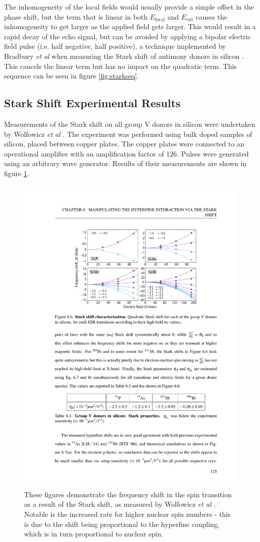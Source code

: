 The inhomogeneity of the local fields would usually provide a simple offset in the phase shift, but the term that is linear in both $E_{\text{local}}$ and $E_{\text{ext}}$ causes the inhomogeneity to get larger as the applied field gets larger.
This would result in a rapid decay of the echo signal, but can be avoided by applying a bipolar electric field pulse (i.e. half negative, half positive), a technique implemented by Bradbury \emph{et al} when measuring the Stark shift of antimony donors in silicon \cite{Bradbury2007}.
This cancels the linear term but has no impact on the quadratic term.
This sequence can be seen in figure \ref{fig:starkseq}.

\subsection{Stark Shift Experimental Results}

Measurements of the Stark shift on all group V donors in silicon were undertaken by Wolfowicz \emph{et al} \cite{Wolfowicz2014,Pica2014}.
The experiment was performed using bulk doped samples of silicon, placed between copper plates.
The copper plates were connected to an operational amplifier with an amplification factor of 126.
Pulses were generated using an arbitrary wave generator.
Results of their measurements are shown in figure \ref{fig:garyStarkResults}.

\begin{figure}
\centering
\includegraphics[width=0.75\columnwidth]{Figures/starkShiftResultsGary.pdf}
\caption[Wolfowicz \emph{et al} Stark measurements]{These figures demonstrate the frequency shift in the spin transition as a result of the Stark shift, as measured by Wolfowicz \emph{et al} \cite{Wolfowicz2014}. Notable is the increased rate for higher nuclear spin numbers - this is due to the shift being proportional to the hyperfine coupling, which is in turn proportional to nuclear spin.}
\label{fig:garyStarkResults}
\end{figure}


